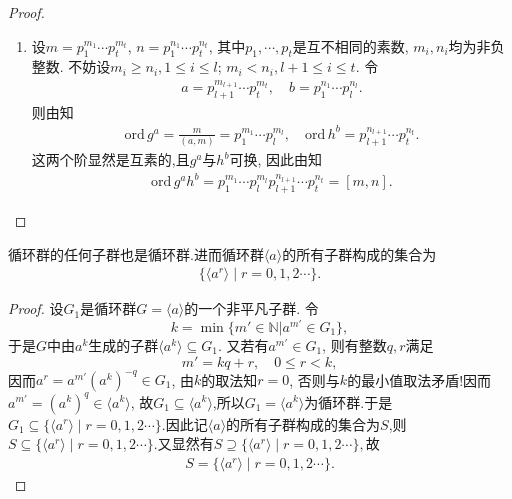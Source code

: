 \documentclass[../../main.tex]{subfiles}%
\begin{document}
\begin{proof}
\begin{enumerate}[(1)]
\item 设$m=p_1^{m_1}\cdots p_t^{m_t}$, $n=p_1^{n_1}\cdots p_t^{n_t}$, 其中$p_1,\cdots,p_t$是互不相同的素数, $m_i, n_i$均为非负整数. 不妨设$m_i \geqslant n_i, 1 \leqslant i \leqslant l$; $m_i < n_i, l+1 \leqslant i \leqslant t$. 令
\begin{align*}
a=p_{l+1}^{m_{l+1}}\cdots p_{t}^{m_t},\quad b=p_{1}^{n_1}\cdots p_{l}^{n_l}.
\end{align*}
则由知
\begin{align*}
\mathrm{ord}\,g^a=\frac{m}{\left( a,m \right)}=p_{1}^{m_1}\cdots p_{l}^{m_l},\quad \mathrm{ord}\,h^b=p_{l+1}^{n_{l+1}}\cdots p_{t}^{n_t}.
\end{align*}
这两个阶显然是互素的,且$g^a$与$h^b$可换, 因此由知
\begin{align*}
\mathrm{ord}\,g^ah^b=p_{1}^{m_1}\cdots p_{l}^{m_l}p_{l+1}^{n_{l+1}}\cdots p_{t}^{n_t}=[m,n].
\end{align*}
\end{enumerate}
\end{proof}

\begin{theorem}[循环群的任何子群也是循环群]\label{theorem:循环群的任何子群也是循环群}
循环群的任何子群也是循环群.进而循环群$\langle a \rangle$的所有子群构成的集合为
\begin{align*}
\{\langle a^r \rangle\mid r=0,1,2\cdots\}.
\end{align*}
\end{theorem}
\begin{proof}
设$G_1$是循环群$G=\langle a\rangle$的一个非平凡子群. 令
\[
k=\min\{m'\in\mathbb{N}|a^{m'}\in G_1\},
\]
于是$G$中由$a^k$生成的子群$\langle a^k\rangle\subseteq G_1$. 又若有$a^{m'}\in G_1$, 则有整数$q,r$满足
\[
m'=kq+r,\quad 0\leqslant r<k,
\]
因而$a^r=a^{m'}(a^k)^{-q}\in G_1$, 由$k$的取法知$r=0$, 否则与$k$的最小值取法矛盾!因而$a^{m'}=(a^k)^q\in\langle a^k\rangle$, 故$G_1\subseteq \langle a^k \rangle$,所以$G_1=\langle a^k\rangle$为循环群.于是$G_1\subseteq \{\langle a^r \rangle\mid r=0,1,2\cdots\}.$因此记$\langle a\rangle$的所有子群构成的集合为$S$,则$S\subseteq \{\langle a^r \rangle\mid r=0,1,2\cdots\}.$又显然有$S\supseteq \{\langle a^r \rangle\mid r=0,1,2\cdots\},$故
\begin{align*}
S= \{\langle a^r \rangle\mid r=0,1,2\cdots\}.
\end{align*}
\end{proof}
\end{document}
